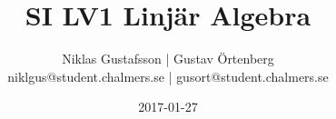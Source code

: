 \documentclass{article}
\title{SI LV1 Linjär Algebra}
\author{Niklas Gustafsson | Gustav Örtenberg  \\ \small{niklgus@student.chalmers.se} | \small{gusort@student.chalmers.se}}
\date{2017-01-27}
\begin{document}
\maketitle
\section{}


\section{}


\section{}


\section{}


\section{}


\section{}

\end{document}
